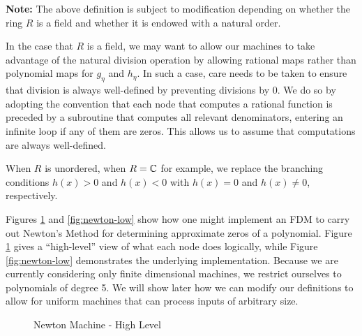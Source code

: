 \textbf{Note: }The above definition is subject to modification
depending on whether the ring $R$ is a field and whether it is endowed
with a natural order.

In the case that $R$ is a field, we may want to allow our machines to
take advantage of the natural division operation by allowing rational
maps rather than polynomial maps for $g_\eta$ and $h_\eta$.  In such a
case, care needs to be taken to ensure that division is always
well-defined by preventing divisions by $0$.  We do so by adopting the
convention that each node that computes a rational function is
preceded by a subroutine that computes all relevant denominators,
entering an infinite loop if any of them are zeros.  This allows us to
assume that computations are always well-defined.

When $R$ is unordered, when $R = \mathbb{C}$ for example, we replace
the branching conditions $h(x) > 0$ and $h(x) < 0$ with $h(x) = 0$ and
$h(x) \neq 0$, respectively.\\

\begin{example}
  Figures \ref{fig:newton-high} and \ref{fig:newton-low} show how one
  might implement an FDM to carry out Newton's Method for determining
  approximate zeros of a polynomial.  Figure \ref{fig:newton-high}
  gives a ``high-level'' view of what each node does logically, while
  Figure \ref{fig:newton-low} demonstrates the underlying
  implementation.  Because we are currently considering only finite
  dimensional machines, we restrict ourselves to polynomials of degree
  5.  We will show later how we can modify our definitions to allow
  for uniform machines that can process inputs of arbitrary size.
\end{example}
\begin{figure}[p]
  \centering


  \caption{Newton Machine - High Level}
  \label{fig:newton-high}
\end{figure}

